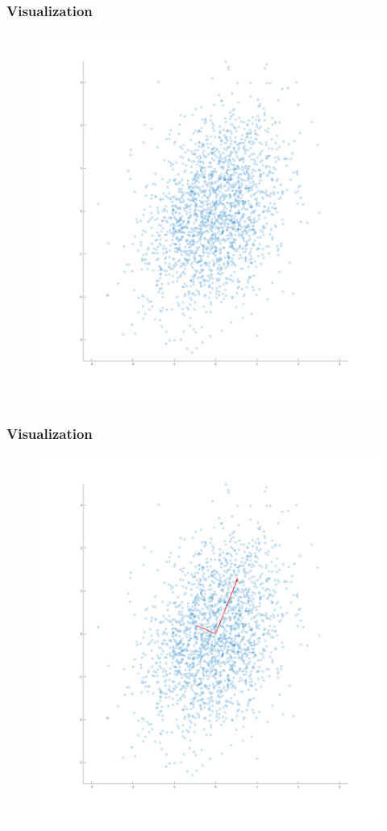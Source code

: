 \documentclass[aspectratio=169,10pt,t]{beamer}
\begin{document}
\begin{frame}[t]
    \frametitle{Visualization}

    \begin{figure}[H]
        \centering
        \includegraphics[width=0.45\linewidth]{images/pca.png}
    \end{figure}


    
\end{frame}
\begin{frame}[t]
    \frametitle{Visualization}

    \begin{figure}[H]
        \centering
        \includegraphics[width=0.45\linewidth]{images/pcaArrow.png}
    \end{figure}
    
\end{frame}
\end{document}
